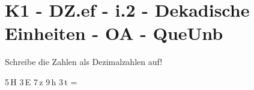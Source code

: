 \section{K1 - DZ.ef - i.2 - Dekadische Einheiten - OA - QueUnb}

\begin{beispiel}{0} %
				Schreibe die Zahlen als Dezimalzahlen auf!\leer
					
					5\,H 3\,E 7\,z 9\,h 3\,t = 
\end{beispiel}